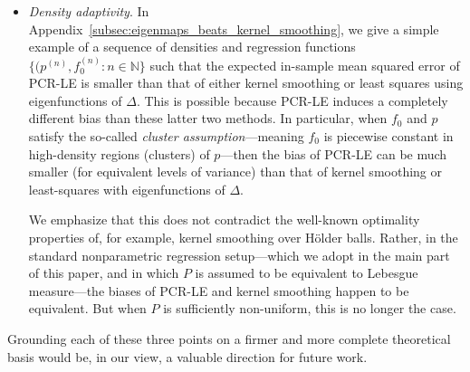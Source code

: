 \begin{itemize}
	\item \emph{Density adaptivity}. In Appendix~\ref{subsec:eigenmaps_beats_kernel_smoothing}, we give a simple example of a sequence of densities and regression functions $\{(p^{(n)}, f_0^{(n)}: n \in \mathbb{N}\}$ such that the expected in-sample mean squared error of PCR-LE is smaller than that of either kernel smoothing or least squares using eigenfunctions of $\Delta$. This is possible because PCR-LE induces a completely different bias than these latter two methods. In particular, when $f_0$ and $p$ satisfy the so-called \emph{cluster assumption}---meaning $f_0$ is piecewise constant in high-density regions (clusters) of $p$---then the bias of PCR-LE can be much smaller (for equivalent levels of variance) than that of kernel smoothing or least-squares with eigenfunctions of $\Delta$. 
	
	We emphasize that this does not contradict the well-known optimality properties of, for example, kernel smoothing over H\"{o}lder balls. Rather, in the standard nonparametric regression setup---which we adopt in the main part of this paper, and in which $P$ is assumed to be equivalent to Lebesgue measure---the biases of PCR-LE and kernel smoothing happen to be equivalent. But when $P$ is sufficiently non-uniform, this is no longer the case.
\end{itemize}
Grounding each of these three points on a firmer and more complete theoretical basis would be, in our view, a valuable direction for future work.